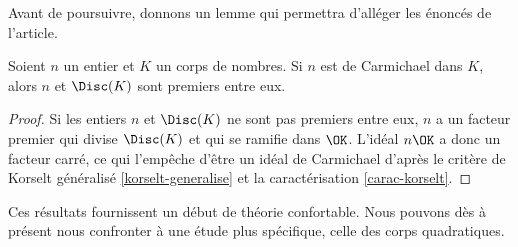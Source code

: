 Avant de poursuivre, donnons un lemme qui permettra d'alléger les énoncés de l'article.

\begin{lemme}
	Soient $n$ un entier et $K$ un corps de nombres. Si $n$ est de Carmichael dans $K$, alors $n$ et $\Disc(K)$ sont premiers entre eux.
\end{lemme}

\begin{proof}
	Si les entiers $n$ et $\Disc(K)$ ne sont pas premiers entre eux, $n$ a un facteur premier qui divise $\Disc(K)$ et qui se ramifie dans $\OK$. L'idéal $n\OK$ a donc un facteur carré, ce qui l'empêche d'être un idéal de Carmichael d'après le critère de Korselt généralisé \ref{korselt-generalise} et la caractérisation \ref{carac-korselt}.
\end{proof}

Ces résultats fournissent un début de théorie confortable. Nous pouvons dès à présent nous confronter à une étude plus spécifique, celle des corps quadratiques.
